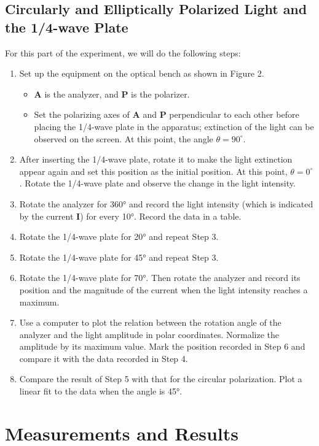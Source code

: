 \documentclass[12pt, a4paper, oneside]{article}
\begin{document}
\subsection{Circularly and Elliptically Polarized Light and the 1/4-wave Plate}
\indent

For this part of the experiment, we will do the following steps:
\begin{enumerate}
    \item Set up the equipment on the optical bench as shown in Figure 2.
    \begin{itemize}
        \item \textbf{A} is the analyzer, and \textbf{P} is the polarizer.
        \item Set the polarizing axes of \textbf{A} and \textbf{P} perpendicular to each other before placing the 1/4-wave plate in the apparatus; extinction of the light can be observed on the screen. At this point, the angle $\theta = 90^\circ$.
    \end{itemize}
    \item After inserting the 1/4-wave plate, rotate it to make the light extinction appear again and set this position as the initial position. At this point, $\theta = 0^\circ$. Rotate the 1/4-wave plate and observe the change in the light intensity.
    \item Rotate the analyzer for 360° and record the light intensity (which is indicated by the current \textbf{I}) for every 10°. Record the data in a table.
    \item Rotate the 1/4-wave plate for 20° and repeat Step 3.
    \item Rotate the 1/4-wave plate for 45° and repeat Step 3.
    \item Rotate the 1/4-wave plate for 70°. Then rotate the analyzer and record its position and the magnitude of the current when the light intensity reaches a maximum.
    \item Use a computer to plot the relation between the rotation angle of the analyzer and the light amplitude in polar coordinates. Normalize the amplitude by its maximum value. Mark the position recorded in Step 6 and compare it with the data recorded in Step 4.
    \item Compare the result of Step 5 with that for the circular polarization. Plot a linear fit to the data when the angle is 45°.
\end{enumerate}

\section{Measurements and Results}
\end{document}
